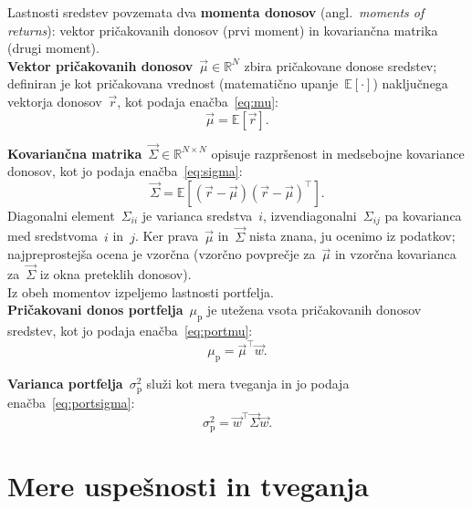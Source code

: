 Lastnosti sredstev povzemata dva \textbf{momenta donosov} (angl.\ \emph{moments of returns}): vektor pričakovanih donosov (prvi moment) in kovariančna matrika (drugi moment).\\

\noindent\textbf{Vektor pričakovanih donosov}~$\vec{\mu} \in \mathbb{R}^N$ zbira pričakovane donose sredstev; definiran je kot pričakovana vrednost (matematično upanje~$\mathbb{E}[\cdot]$) naključnega vektorja donosov~$\vec{r}$, kot podaja enačba~\eqref{eq:mu}:
\begin{equation}
\label{eq:mu}
  \vec{\mu} = \mathbb{E}[\vec{r}].
\end{equation}

\noindent\textbf{Kovariančna matrika}~$\vec{\Sigma} \in \mathbb{R}^{N\times N}$ opisuje razpršenost in medsebojne kovariance donosov, kot jo podaja enačba~\eqref{eq:sigma}:
\begin{equation}
\label{eq:sigma}
  \vec{\Sigma} = \mathbb{E}\left[(\vec{r}-\vec{\mu})(\vec{r}-\vec{\mu})^{\!\top}\right].
\end{equation}
Diagonalni element~$\Sigma_{ii}$ je varianca sredstva~$i$, izvendiagonalni~$\Sigma_{ij}$ pa kovarianca med sredstvoma~$i$ in~$j$. Ker prava~$\vec{\mu}$ in~$\vec{\Sigma}$ nista znana, ju ocenimo iz podatkov; najpreprostejša ocena je vzorčna (vzorčno povprečje za~$\vec{\mu}$ in vzorčna kovarianca za~$\vec{\Sigma}$ iz okna preteklih donosov).\\

\noindent Iz obeh momentov izpeljemo lastnosti portfelja.\\

\noindent\textbf{Pričakovani donos portfelja}~$\mu_{\text{p}}$ je utežena vsota pričakovanih donosov sredstev, kot jo podaja enačba~\eqref{eq:portmu}:
\begin{equation}
\label{eq:portmu}
  \mu_{\text{p}} = \vec{\mu}^{\!\top}\vec{w}.
\end{equation}

\noindent\textbf{Varianca portfelja}~$\sigma_{\text{p}}^2$ služi kot mera tveganja in jo podaja enačba~\eqref{eq:portsigma}:
\begin{equation}
\label{eq:portsigma}
  \sigma_{\text{p}}^2 = \vec{w}^{\!\top}\vec{\Sigma}\vec{w}.
\end{equation}

\newpage
\section{Mere uspešnosti in tveganja}
\label{sec:metrics}

